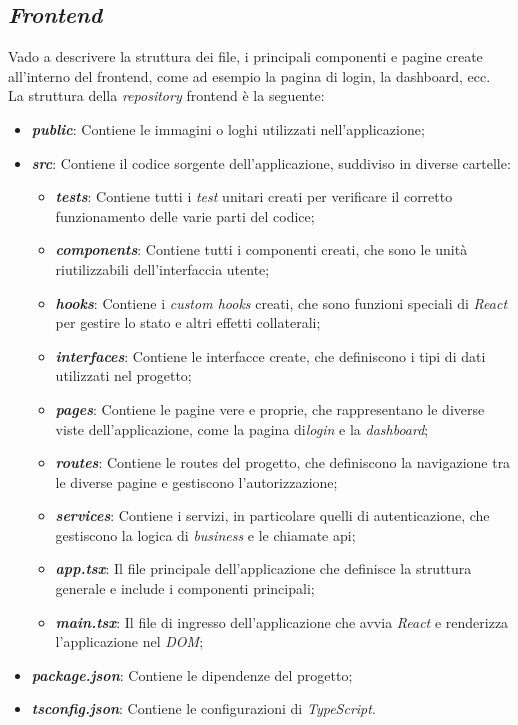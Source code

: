 \subsection{\textit{Frontend}}
\label{sez:frontend}

Vado a descrivere la struttura dei file, i principali componenti e pagine create all'interno del frontend, come ad esempio la pagina di login, la dashboard, ecc.\\

La struttura della \textit{repository} \gls{frontend} è la seguente:

\begin{itemize}
    \item \textbf{\textit{public}}: Contiene le immagini o loghi utilizzati nell'applicazione;
    \item \textbf{\textit{src}}: Contiene il codice sorgente dell'applicazione, suddiviso in diverse cartelle:
    \begin{itemize}
        \item \textbf{\textit{tests}}: Contiene tutti i \textit{test} unitari creati per verificare il corretto funzionamento delle varie parti del codice;
        \item \textbf{\textit{components}}: Contiene tutti i componenti creati, che sono le unità riutilizzabili dell'interfaccia utente;
        \item \textbf{\textit{hooks}}: Contiene i \textit{custom hooks} creati, che sono funzioni speciali di \textit{React} per gestire lo stato e altri effetti collaterali;
        \item \textbf{\textit{interfaces}}: Contiene le interfacce create, che definiscono i tipi di dati utilizzati nel progetto;
        \item \textbf{\textit{pages}}: Contiene le pagine vere e proprie, che rappresentano le diverse viste dell'applicazione, come la pagina di\textit{login} e la \textit{dashboard};
        \item \textbf{\textit{routes}}: Contiene le routes del progetto, che definiscono la navigazione tra le diverse pagine e gestiscono l'autorizzazione;
        \item \textbf{\textit{services}}: Contiene i servizi, in particolare quelli di autenticazione, che gestiscono la logica di \textit{business} e le chiamate \gls{api};
        \item \textbf{\textit{app.tsx}}: Il file principale dell'applicazione che definisce la struttura generale e include i componenti principali;
        \item \textbf{\textit{main.tsx}}: Il file di ingresso dell'applicazione che avvia \textit{React} e renderizza l'applicazione nel \textit{DOM};
    \end{itemize}
    \item \textbf{\textit{package.json}}: Contiene le dipendenze del progetto;
    \item \textbf{\textit{tsconfig.json}}: Contiene le configurazioni di \textit{TypeScript}.
\end{itemize}


